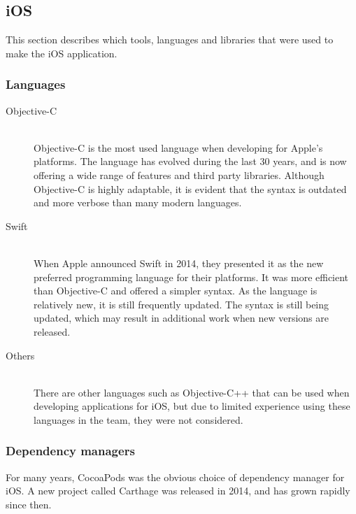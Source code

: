 \subsection{iOS}
This section describes which tools, languages and libraries that were used to make the iOS application.

\subsubsection{Languages}
\begin{description}
    \item[Objective-C] \hfill \\
        Objective-C is the most used language when developing for Apple's platforms.\cite{programming-language-popularity-statistics} The language has evolved during the last 30 years, and is now offering a wide range of features and third party libraries. Although Objective-C is highly adaptable, it is evident that the syntax is outdated and more verbose than many modern languages. 
    \item[Swift] \hfill \\
        When Apple announced Swift in 2014, they presented it as the new preferred programming language for their platforms. It was more efficient than Objective-C and offered a simpler syntax.\cite{objc-swift-comparison} As the language is relatively new, it is still frequently updated. The syntax is still being updated, which may result in additional work when new versions are released.
    \item[Others] \hfill \\
        There are other languages such as Objective-C++ that can be used when developing applications for iOS, but due to limited experience using these languages in the team, they were not considered.
\end{description}

\subsubsection{Dependency managers}
For many years, CocoaPods was the obvious choice of dependency manager for iOS.\cite{cocoapods} A new project called Carthage was released in 2014, and has grown rapidly since then.\cite{carthage}

